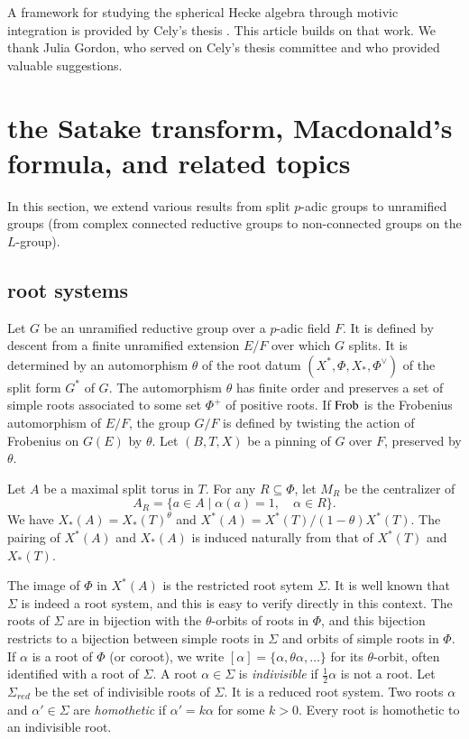 A framework for studying the spherical Hecke algebra through motivic
integration is provided by Cely's thesis \cite{cely}.  This article
builds on that work.  We thank Julia Gordon, who served on Cely's
thesis committee and who provided valuable suggestions.



\section{the Satake transform, Macdonald's formula, and related topics}

In this section, we extend various results from split $p$-adic groups
to unramified groups (from complex connected reductive groups to
non-connected groups on the $L$-group).

\subsection{root systems}

Let $G$ be an unramified reductive group over a $p$-adic field $F$.
It is defined by descent from a finite unramified extension $E/F$ over
which $G$ splits.  It is determined by an automorphism $\theta$ of the
root datum $(X^*,\Phi,X_*,\Phi^\vee)$ of the split form $G^*$ of $G$.
The automorphism $\theta$ has finite order and preserves a set of
simple roots associated to some set $\Phi^+$ of positive roots.  If
${\operatorname{Frob}}$ is the Frobenius automorphism of $E/F$, the group $G/F$ is
defined by twisting the action of Frobenius on $G(E)$ by $\theta$.  Let
$(B,T,X)$ be a pinning of $G$ over $F$, preserved by $\theta$.

Let $A$ be a maximal split torus in $T$.  For any $R\subseteq \Phi$,
let $M_R$ be the centralizer of
\[
A_R = \{a\in A\mid \alpha(a)=1,\quad \alpha\in R\}.
\]
We have $X_*(A) = X_*(T)^\theta$ and $X^*(A) =
X^*(T)/(1-\theta)X^*(T)$.  The pairing of $X^*(A)$ and $X_*(A)$ is
induced naturally from that of $X^*(T)$ and $X_*(T)$.

The image of $\Phi$ in $X^*(A)$ is the restricted root sytem $\Sigma$.
It is well known that $\Sigma$ is indeed a root system, and this is
easy to verify directly in this context.  The roots of $\Sigma$ are in
bijection with the $\theta$-orbits of roots in $\Phi$, and this
bijection restricts to a bijection between simple roots in $\Sigma$
and orbits of simple roots in $\Phi$.  If $\alpha$ is a root of $\Phi$
(or coroot), we write $[\alpha]=\{\alpha,\theta\alpha,\ldots\}$ for
its $\theta$-orbit, often identified with a root of $\Sigma$.
A root $\alpha\in\Sigma$ is {\it indivisible} if $\frac12\alpha$ is not a root.
Let $\Sigma_{red}$ be the set of %
indivisible roots of $\Sigma$.  It is a reduced root system.
Two roots $\alpha$ and $\alpha'\in\Sigma$ are {\it homothetic} if
$\alpha' = k\alpha$ for some $k>0$.  Every root is homothetic to an
indivisible root.  %


